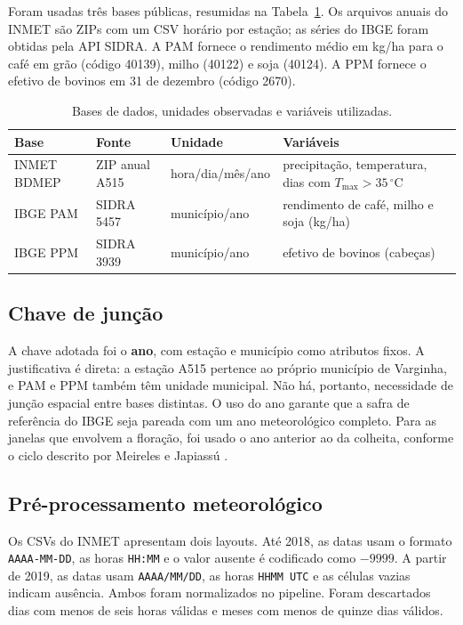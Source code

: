 \documentclass{RITA}
\begin{document}
Foram usadas tr\^es bases p\'ublicas, resumidas na Tabela~\ref{tab:bases}. Os arquivos anuais do INMET s\~ao ZIPs com um CSV hor\'ario por esta\c{c}\~ao; as s\'eries do IBGE foram obtidas pela API SIDRA. A PAM fornece o rendimento m\'edio em kg/ha para o caf\'e em gr\~ao (c\'odigo 40139), milho (40122) e soja (40124). A PPM fornece o efetivo de bovinos em 31 de dezembro (c\'odigo 2670).

\begin{table}[ht]
\begin{center}
\caption{Bases de dados, unidades observadas e vari\'aveis utilizadas.}
\label{tab:bases}
\begin{tabular}{llll}
\hline
Base & Fonte & Unidade & Vari\'aveis \\
\hline
INMET BDMEP & ZIP anual A515 & hora/dia/m\^es/ano & precipita\c{c}\~ao, temperatura, dias com $T_{\max}>35\,^\circ$C \\
IBGE PAM & SIDRA 5457 & munic\'ipio/ano & rendimento de caf\'e, milho e soja (kg/ha) \\
IBGE PPM & SIDRA 3939 & munic\'ipio/ano & efetivo de bovinos (cabe\c{c}as) \\
\hline
\end{tabular}
\end{center}
\end{table}

\subsection{Chave de jun\c{c}\~ao}

A chave adotada foi o \textbf{ano}, com esta\c{c}\~ao e munic\'ipio como atributos fixos. A justificativa \'e direta: a esta\c{c}\~ao A515 pertence ao pr\'oprio munic\'ipio de Varginha, e PAM e PPM tamb\'em t\^em unidade municipal. N\~ao h\'a, portanto, necessidade de jun\c{c}\~ao espacial entre bases distintas. O uso do ano garante que a safra de refer\^encia do IBGE seja pareada com um ano meteorol\'ogico completo. Para as janelas que envolvem a flora\c{c}\~ao, foi usado o ano anterior ao da colheita, conforme o ciclo descrito por Meireles e Japiass\'u \cite{meireles2009}.

\subsection{Pr\'e-processamento meteorol\'ogico}

Os CSVs do INMET apresentam dois layouts. At\'e 2018, as datas usam o formato \texttt{AAAA-MM-DD}, as horas \texttt{HH:MM} e o valor ausente \'e codificado como $-9999$. A partir de 2019, as datas usam \texttt{AAAA/MM/DD}, as horas \texttt{HHMM UTC} e as c{\'e}lulas vazias indicam aus\^encia. Ambos foram normalizados no pipeline. Foram descartados dias com menos de seis horas v\'alidas e meses com menos de quinze dias v\'alidos.
\end{document}
